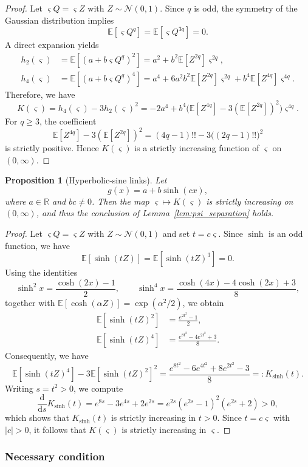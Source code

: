 \documentclass[12pt,reqno]{amsart}
\newtheorem{proposition}{Proposition}
\newcommand{\E}{\mathbb{E}}
\renewcommand{\d}{\mathrm{d}}
\def\d{\mathrm{d}}
\begin{document}
{\begin{proof}
Let $\varsigma Q=\varsigma Z$ with $Z\sim\mathcal N(0,1)$.
Since $q$ is odd, the symmetry of the Gaussian distribution implies
\[
\E[\varsigma Q^{q}]=\E[\varsigma Q^{3q}]=0.
\]
A direct expansion yields
\begin{align*}
h_2(\varsigma)
&=\E[(a+b\varsigma Q^{q})^2]
=a^2+b^2\E[Z^{2q}] \varsigma^{2q},\\
h_4(\varsigma)
&=\E[(a+b\varsigma Q^{q})^4]
=a^4+6a^2b^2\E[Z^{2q}] \varsigma^{2q}
+b^4\E[Z^{4q}] \varsigma^{4q}.
\end{align*}
Therefore, we have
\[
K(\varsigma)
=h_4(\varsigma)-3h_2(\varsigma)^2
=-2a^4
+b^4\Big(\E[Z^{4q}]-3(\E[Z^{2q}])^2\Big)\varsigma^{4q}.
\]
For $q\ge 3$, the coefficient
\[
\E[Z^{4q}]-3(\E[Z^{2q}])^2=(4q-1)!!-3\big((2q-1)!!\big)^2
\]
is strictly positive.
Hence $K(\varsigma)$ is a strictly increasing function of $\varsigma$ on $(0,\infty)$.
\end{proof}

\begin{proposition}[Hyperbolic-sine links]
\label{prop:sinh}
Let
\[
g(x)=a+b\sinh(cx),
\]
where $a\in\mathbb R$ and $bc\neq 0$.
Then the map $\varsigma\mapsto K(\varsigma)$ is strictly increasing on $(0,\infty)$, and thus the conclusion of Lemma~\ref{lem:psi_separation} holds.
\end{proposition}

\begin{proof}
Let $\varsigma Q=\varsigma Z$ with $Z\sim\mathcal N(0,1)$ and set $t=c\varsigma$.
Since $\sinh$ is an odd function, we have
\[
\E[\sinh(tZ)]=\E[\sinh(tZ)^3]=0.
\]
Using the identities
\[
\sinh^2 x=\frac{\cosh(2x)-1}{2},
\qquad
\sinh^4 x=\frac{\cosh(4x)-4\cosh(2x)+3}{8},
\]
together with $\E[\cosh(\alpha Z)]=\exp(\alpha^2/2)$, we obtain
\begin{align*}
\E[\sinh(tZ)^2]
&=\frac{e^{2t^2}-1}{2},\\
\E[\sinh(tZ)^4]
&=\frac{e^{8t^2}-4e^{2t^2}+3}{8}.
\end{align*}
Consequently, we have
\[
\E[\sinh(tZ)^4]-3\E[\sinh(tZ)^2]^2
=\frac{e^{8t^2}-6e^{4t^2}+8e^{2t^2}-3}{8}
=:K_{\sinh}(t).
\]
Writing $s=t^2>0$, we compute
\[
\frac{\d}{\d s}K_{\sinh}(t)
=e^{8s}-3e^{4s}+2e^{2s}
=e^{2s}(e^{2s}-1)^2(e^{2s}+2)>0,
\]
which shows that $K_{\sinh}(t)$ is strictly increasing in $t>0$.
Since $t=c\varsigma$ with $|c|>0$, it follows that $K(\varsigma)$ is strictly increasing in $\varsigma$.
\end{proof}

\subsubsection{Necessary condition}
\label{sec:necessary_A5_both}

}
\end{document}
